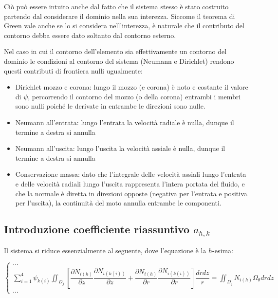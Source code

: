 \documentclass{tufte-handout}
\newcommand{\de}[2]{\dfrac{\partial #1}{\partial #2}}
\begin{document}
Ciò può essere intuito anche dal fatto che il sistema stesso è stato costruito partendo dal considerare il dominio nella sua interezza. Siccome il teorema di Green vale anche se lo si considera nell'interezza, è naturale che il contributo del contorno debba essere dato soltanto dal contorno esterno.

Nel caso in cui il contorno dell'elemento sia effettivamente un contorno del dominio le condizioni al contorno del sistema (Neumann e Dirichlet) rendono questi contributi di frontiera nulli ugualmente:
\begin{itemize}
    \item {Dirichlet mozzo e corona: lungo il mozzo (e corona) è noto e costante il valore di $\psi$, percorrendo il contorno del mozzo (o della corona) entrambi i membri sono nulli poiché le derivate in entrambe le direzioni sono nulle.}
    \item {Neumann all'entrata: lungo l'entrata la velocità radiale è nulla, dunque il termine a destra si annulla}
    \item {Neumann all'uscita:  lungo l'uscita la velocità assiale è nulla, dunque il termine a destra si annulla}
    \item {Conservazione massa: dato che l'integrale delle velocità assiali lungo l'entrata e delle velocità radiali lungo l'uscita rappresenta l'intera portata del fluido, e che la normale è diretta in direzioni opposte (negativa per l'entrata e positiva per l'uscita), la continuità del moto annulla entrambe le componenti.}
\end{itemize}

\subsection{Introduzione coefficiente riassuntivo $a_{h,k}$}
Il sistema si riduce essenzialmente al seguente, dove l'equazione è la $h$-esima:
\begin{fullwidth}
\[\begin{cases}
    ...\\
    \sum_{i=1}^4 \psi_{k(i)}
     \iint_{D_j} \left[
          \de{N_{i(h)}}{z}\de{N_{i(k(i))}}{z}
        + \de{N_{i(h)}}{r}\de{N_{i(k(i))}}{r}
    \right] \dfrac{dr dz}{r}
    =
    \iint_{D_j} N_{i(h)}\Omega_\theta dr dz \\
    ...
\end{cases}
\]
\end{fullwidth}
\end{document}
